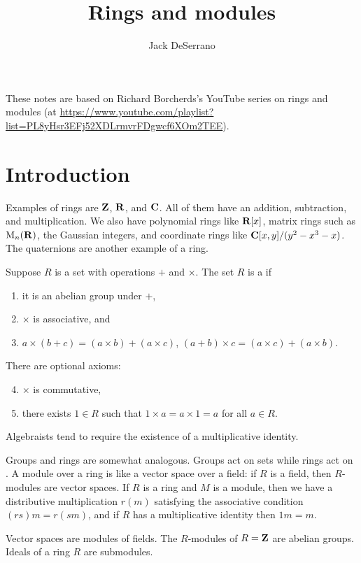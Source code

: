 \documentclass[11pt, oneside,margin=1in]{article}
\title{Rings and modules}
\author{Jack DeSerrano}
\begin{document}
\ifams
    \vspace*{\fill}
\fi
\maketitle
These notes are based on Richard Borcherds's YouTube series on rings and modules (at \url{https://www.youtube.com/playlist?list=PL8yHsr3EFj52XDLrmvrFDgwcf6XOm2TEE}).
\tableofcontents
\ifams
	\vspace*{\fill}
\fi
\newpage
\section{Introduction}
Examples of rings are $\mathbf Z$, $\mathbf R$, and $\mathbf C$. All of them have an addition, subtraction, and multiplication. We also have polynomial rings like $\mathbf R[x]$, matrix rings such as $\operatorname{M}_n(\mathbf R)$, the Gaussian integers, and coordinate rings like $\mathbf C[x,y]/(y^2 - x^3 -x)$. The quaternions are another example of a ring.

Suppose $R$ is a set with operations $+$ and $\times$. The set $R$ is a  if 
\begin{enumerate}
\item it is an abelian group under $+$,
\item $\times$ is associative, and
\item $a \times (b+c) = (a\times b) + (a\times c)$, $(a + b)\times c = (a\times c) + (a\times b)$.
\end{enumerate}
There are optional axioms:
\begin{enumerate}
\setcounter{enumi}{3}
\item $\times$ is commutative,
\item there exists $ 1\in R$ such that $1\times a=a \times 1=a$ for all $ a\in R$.
\end{enumerate}
Algebraists tend to require the existence of a multiplicative identity.

Groups and rings are somewhat analogous. Groups act on sets while rings act on . A module over a ring is like a vector space over a field: if $R$ is a field, then $R$-modules are vector spaces. If $R$ is a ring and $M$ is a module, then we have a distributive multiplication $r(m)$ satisfying the associative condition $(rs)m = r(sm)$, and if $R$ has a multiplicative identity then $1m = m$. 
\begin{example}[Modules]
Vector spaces are modules of fields. The $R$-modules of $R =\mathbf Z$ are abelian groups. Ideals of a ring $R$ are submodules.
\end{example}
\end{document}
